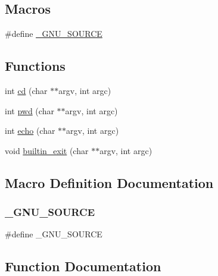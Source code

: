 \subsection*{Macros}
\begin{DoxyCompactItemize}
\item 
\#define \mbox{\hyperlink{built-in_8h_a369266c24eacffb87046522897a570d5}{\+\_\+\+G\+N\+U\+\_\+\+S\+O\+U\+R\+CE}}
\end{DoxyCompactItemize}
\subsection*{Functions}
\begin{DoxyCompactItemize}
\item 
int \mbox{\hyperlink{built-in_8h_a6e03260ed7d8b2ac33c1116c55c2cec7}{cd}} (char $\ast$$\ast$argv, int argc)
\item 
int \mbox{\hyperlink{built-in_8h_a7f540865bf44effc4cd5f843a0d29388}{pwd}} (char $\ast$$\ast$argv, int argc)
\item 
int \mbox{\hyperlink{built-in_8h_ae985125913017d37bb75b1ab7b977950}{echo}} (char $\ast$$\ast$argv, int argc)
\item 
void \mbox{\hyperlink{built-in_8h_a203155f52ab90e655b8040e61130dbcc}{builtin\+\_\+exit}} (char $\ast$$\ast$argv, int argc)
\end{DoxyCompactItemize}


\subsection{Macro Definition Documentation}
\mbox{\label{built-in_8h_a369266c24eacffb87046522897a570d5}} 
\subsubsection{\texorpdfstring{\+\_\+\+G\+N\+U\+\_\+\+S\+O\+U\+R\+CE}{\_GNU\_SOURCE}}
{\footnotesize\ttfamily \#define \+\_\+\+G\+N\+U\+\_\+\+S\+O\+U\+R\+CE}



\subsection{Function Documentation}
\mbox{\label{built-in_8h_a203155f52ab90e655b8040e61130dbcc}} 
